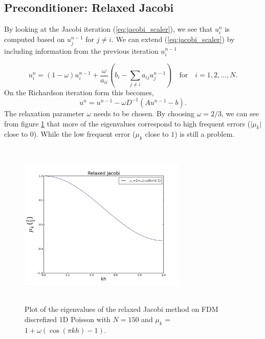 \subsection{Preconditioner: Relaxed Jacobi}
By looking at the Jacobi iteration (\ref{eq:jacobi_scaler}), we see that $u^n_i$ is 
computed based on $u^{n-1}_j$ for $j \neq i$. We can extend (\ref{eq:jacobi_scaler}) by including information 
from the previous iteration $u^{n-1}_i$

\begin{equation}
\label{eq:relaxed_jacobi_scaler}
u^{n}_{i} = (1-\omega)u^{n-1}_i + \frac{\omega}{a_{ii}}(b_i - \sum_{j \neq i} a_{ij}u^{n-1}_j) \quad 
\text{for} \quad i = 1,2, ... , N. 
\end{equation}
On the Richardson iteration form this becomes,
\begin{equation}
\label{eq:jacobi_matrix}
u^n = u^{n-1} - \omega D^{-1}(Au^{n-1} - b).
\end{equation}
The relaxation parameter $\omega$ needs to be chosen. 
By choosing $\omega = 2/3$, we can see from figure \ref{fig:relaxed_Jacobi} that more of  
the eigenvalues correspond to high frequent errors ($\vert \mu_k\vert$ close to $0$). While the 
low frequent error ($\mu_k$ close to $1$) is still a problem. 


\begin{figure}
\includegraphics[width=8cm, height=8cm]{chapters/iterative_methods/plots/relax_jacobi_plot}
\caption{Plot of the eigenvalues of the relaxed Jacobi method on FDM 
discrefized 1D Poisson with $N = 150$ and $\mu_k$ = $1+ \omega(\cos(\pi k h )-1)$.}
\label{fig:relaxed_Jacobi}
\end{figure}

